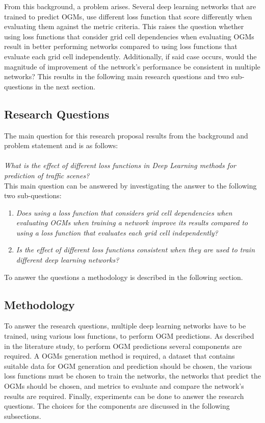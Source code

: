 From this background, a problem arises. Several deep learning networks that are trained to predict \glspl{OGM}, use different loss function that score differently when evaluating them against the metric criteria. This raises the question whether using loss functions that consider grid cell dependencies when evaluating \glspl{OGM} result in better performing networks compared to using loss functions that evaluate each grid cell independently. Additionally, if said case occurs, would the magnitude of improvement of the network's performance be consistent in multiple networks? This results in the following main research questions and two sub-questions in the next section. 

\subsection{Research Questions} \label{subsec:rp_questions}
The main question for this research proposal results from the background and problem statement and is as follows: \\ \\
\textit{What is the effect of different loss functions in Deep Learning methods for  prediction of traffic scenes?} \\

This main question can be answered by investigating the answer to the following two sub-questions:

\begin{enumerate}
	\item \textit{Does using a loss function that considers grid cell dependencies when evaluating \glspl{OGM} when training a network improve its results compared to using a loss function that evaluates each grid cell independently?}
	\item \textit{Is the effect of different loss functions consistent when they are used to train different deep learning networks?}
\end{enumerate}

To answer the questions a methodology is described in the following section.

\subsection{Methodology}  \label{subsec:rp_methodology}
To answer the research questions, multiple deep learning networks have to be trained, using various loss functions, to perform \gls{OGM} predictions. As described in the literature study, to perform \gls{OGM} predictions several components are required. A \glspl{OGM} generation method is required, a dataset that contains suitable data for \gls{OGM} generation and prediction should be chosen, the various loss functions must be chosen to train the networks, the networks that predict the \glspl{OGM} should be chosen, and metrics to evaluate and compare the network's results are required. Finally, experiments can be done to answer the research questions. The choices for the components are discussed in the following subsections. 

